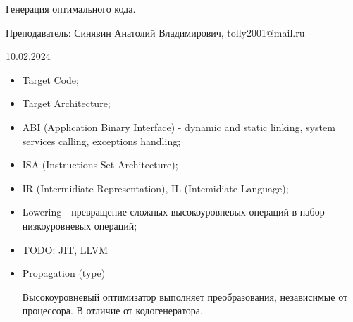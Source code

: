\documentclass{article}
\begin{document}
Генерация оптимального кода.

Преподаватель: Синявин Анатолий Владимирович, tolly2001@mail.ru

10.02.2024

\begin{itemize}
  \item Target Code;
  \item Target Architecture;
  \item ABI (Application Binary Interface) - dynamic and static linking, system
    services calling, exceptions handling;
  \item ISA (Instructions Set Architecture);
  \item IR (Intermidiate Representation), IL (Intemidiate Language);
  \item Lowering - превращение сложных высокоуровневых операций в набор
    низкоуровневых операций;
  \item TODO: JIT, LLVM
  \item Propagation (type)

  Высокоуровневый оптимизатор выполняет преобразования, независимые от
  процессора. В отличие от кодогенератора.
\end{itemize}
\end{document}
